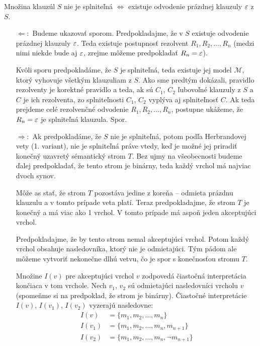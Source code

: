 \begin{veta} 
    Množina klauzúl $S$ nie je splniteľná $\iff$ 
    existuje odvodenie prázdnej klauzuly $\varepsilon$ z $S$.
\end{veta}

\begin{dokaz}
\noindent
    \begin{itemize}
    \item[$\Leftarrow:$]
        Budeme ukazovať sporom.
        Predpokladajme, že v $S$ existuje odvodenie prázdnej klauzuly $\varepsilon$. 
        Teda existuje postupnosť rezolvent $R_1, R_2, \dots, R_n$ 
        (medzi nimi niekde bude aj $\varepsilon$, zrejme môžeme predpokladať
        $R_n = \varepsilon$).

        Kvôli sporu predpokladáme, že $S$ je splniteľná, 
        teda existuje jej model $\mathcal{M}$, ktorý
        vyhovuje všetkým klauzuliam z $S$. Ako sme predtým dokázali,
        pravidlo rezolventy je korektné pravidlo a teda, ak sú
        $C_1$, $C_2$ ľubovoľné klauzuly z $S$ a $C$ je ich rezolventa,
        zo splniteľnosti $C_1$, $C_2$ vyplýva aj splniteľnosť $C$.
        Ak teda prejdeme celé rezolvenčné odvodenie $R_1,R_2,\dots,R_n$,
        postupne ukážeme, že $R_n=\varepsilon$ je splniteľná klauzula. Spor.

    \item[$\Rightarrow:$] Ak
        predpokladáme, že $S$ nie je splniteľná,
        potom podľa Herbrandovej vety (1. variant),
        nie je splniteľná práve vtedy, keď je možné jej priradiť konečný
        uzavretý sémantický strom $T$. Bez ujmy na všeobecnosti budeme
        ďalej predpokladať, že tento strom je binárny, teda každý
        vrchol má najviac dvoch synov.

        Môže as stať, že strom $T$ pozostáva jedine z koreňa --
        odmieta prázdnu klauzulu a v tomto prípade veta platí.
        Teraz predpokladajme, že strom $T$ je konečný a má viac ako 1 vrchol.
        V tomto prípade má aspoň jeden akceptujúci vrchol.

        Predpokladajme, že by tento strom nemal akceptujúci vrchol.
        Potom každý vrchol obsahuje nasledovníka, ktorý nie je odmietajúci.
        Tým pádom ale môžeme vytvoriť nekonečne dlhú vetvu,
        čo je spor s konečnosťou stromu $T$.

        Množine $I(v)$ pre akceptujúci vrchol $v$
        zodpovedá čiastočná interpretácia končiaca v tom vrchole.
        Nech $v_1$, $v_2$ sú odmietajúci nasledovníci vrcholu $v$
        (spomeňme si na predpoklad, že strom je binárny).
        Čiastočné interpretácie $I(v)$, $I(v_1)$, $I(v_2)$ vyzerajú
        nasledovne:
        \begin{align*}
            I(v)    &= \{ m_1, m_2, \ldots, m_n \} \\
            I(v_1)  &= \{ m_1, m_2, \ldots, m_n, m_{n+1} \}  \\
            I(v_2)  &= \{ m_1, m_2, \ldots, m_n, \neg m_{n+1} \} 
        \end{align*}


\end{itemize}
\end{dokaz}
